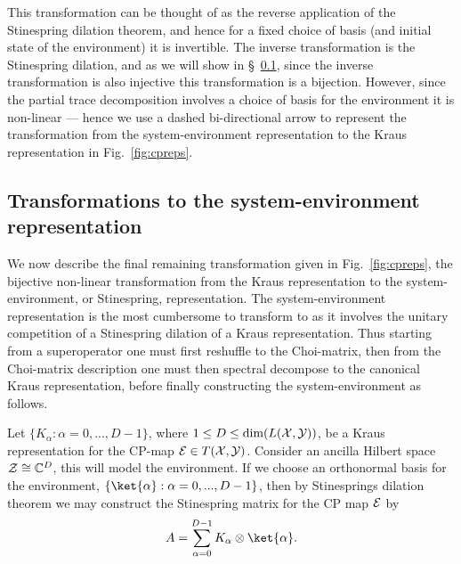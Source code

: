 This transformation can be thought of as the reverse application of the Stinespring dilation theorem, and hence for a fixed choice of basis (and initial state of the environment) it is invertible. The inverse transformation is the Stinespring dilation, and as we will show in \S~\ref{sec:to-se}, since the inverse transformation is also injective this transformation is a bijection. However, since the partial trace decomposition involves a choice of basis for the environment it is non-linear --- hence we use a dashed bi-directional arrow to represent the transformation from the system-environment representation to the Kraus representation in Fig.~\ref{fig:cpreps}. 


\subsection{Transformations to the system-environment representation}
\label{sec:to-se}

We now describe the final remaining transformation given in Fig.~\ref{fig:cpreps}, the bijective non-linear transformation from the Kraus representation to the system-environment, or Stinespring, representation. The system-environment representation is the most cumbersome to transform to as it involves the unitary competition of a Stinespring dilation of a Kraus representation. Thus starting from a superoperator one must first reshuffle to the Choi-matrix, then from the Choi-matrix description one must then spectral decompose to the canonical Kraus representation, before finally constructing the system-environment as follows.

Let $\{ K_\alpha:\alpha=0,..., D-1\}$, where $1\le D\le \mbox{dim}({L(\mathcal{X,Y})})$, be a Kraus representation for the CP-map ${\cal E}\in {T(\mathcal{X,Y})}$. Consider an ancilla Hilbert space ${\cal Z}\cong {\mathbb C}^D$, this will model the environment. If we choose an orthonormal basis for the environment, $\{\ket{\alpha}: \alpha=0,...,D-1\}$, then by Stinesprings dilation theorem we may construct the Stinespring matrix for the CP map ${\cal E}$ by 
\begin{equation}
A = \sum_{\alpha=0}^{D-1} K_\alpha \otimes\ket{\alpha}.
\label{eqn:kraus2stinespring}
\end{equation}

